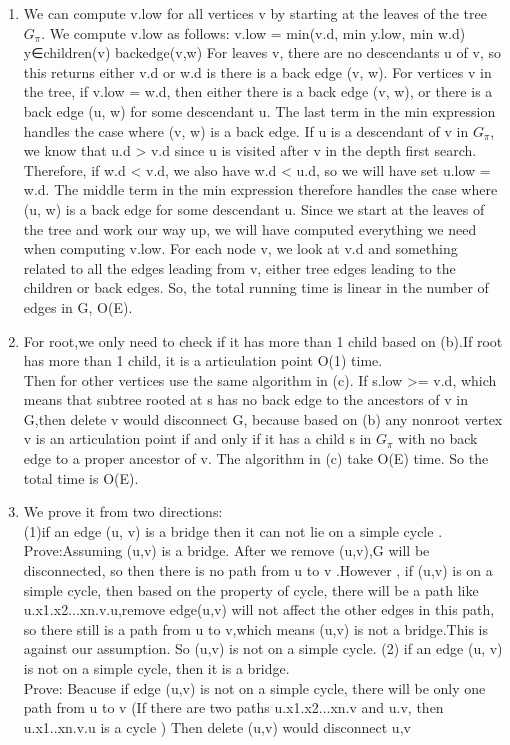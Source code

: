 \documentclass[paper=a4, fontsize=11pt]{scrartcl} %
\numberwithin{equation}{section} %
\numberwithin{figure}{section} %
\numberwithin{table}{section} %
\begin{document}
\begin{enumerate}[label={2.(\alph*)}]
  \item
We can compute v.low for all vertices v by starting at the leaves of the tree ${G_\pi}$. We compute v.low as follows:
v.low = min(v.d, min y.low, min w.d) y∈children(v) backedge(v,w)
For leaves v, there are no descendants u of v, so this returns either v.d or w.d is there is a back edge (v, w). For vertices v in the tree, if v.low = w.d, then either there is a back edge (v, w), or there is a back edge (u, w) for some descendant u. The last term in the min expression handles the case where (v, w) is a back edge. If u is a descendant of v in ${G_\pi}$, we know that u.d > v.d since u is visited after v in the depth first search. Therefore, if w.d < v.d, we also have w.d < u.d, so we will have set u.low = w.d. The middle term in the min expression therefore handles the case where (u, w) is a back edge for some descendant u. Since we start at the leaves of the tree and work our way up, we will have computed everything we need when computing v.low.
For each node v, we look at v.d and something related to all the edges leading from v, either tree edges leading to the children or back edges. So, the total running time is linear in the number of edges in G, O(E).

  \item 
For root,we only need to check if it has more than 1 child based on (b).If root has more than 1 child, it is a articulation point
O(1) time.\\
Then for other vertices  use the same algorithm in (c). If s.low >= v.d, which means that subtree rooted at s has no back edge to  the ancestors of v in G,then delete v would disconnect G, because based on (b)  any nonroot vertex v is an articulation point if and only if it has a child s in  ${G_\pi}$ with no back edge to a proper ancestor of v. The algorithm in (c) take O(E) time.
So the total time is O(E).

  \item 
We prove it from two directions:\\
(1)if an edge (u, v) is a bridge then it can not lie on a simple cycle .\\
Prove:Assuming (u,v) is a bridge. After we  remove (u,v),G  will be disconnected, so  then there is no path from u to v .However , if (u,v) is on a simple cycle, then based on the property of cycle, there will be a path like u.x1.x2...xn.v.u,remove edge(u,v) will not affect the other edges in this path, so there still is a path from u to v,which means (u,v) is not a bridge.This is against our assumption. So (u,v) is not on a simple cycle.  
(2) if an edge (u, v) is not on a simple cycle, then it is a bridge.\\
Prove: Beacuse if edge (u,v) is not on a simple cycle, there will be only one path from u to v (If there are two paths u.x1.x2...xn.v and  u.v, then u.x1..xn.v.u is a cycle ) Then delete (u,v) would disconnect u,v 



\end{enumerate}
\end{document}
